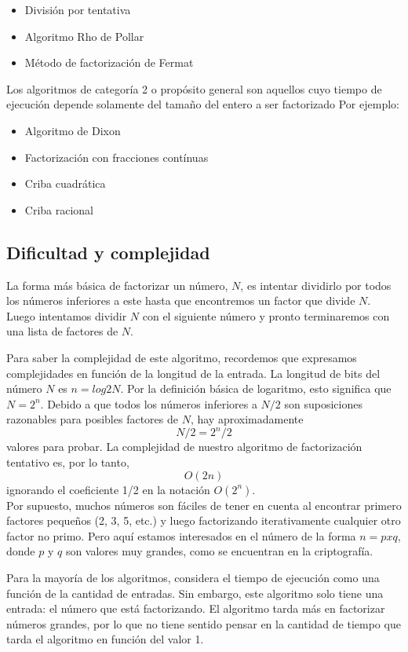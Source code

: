 \documentclass{article}
\begin{document}
\begin{itemize}
    \item División por tentativa
    \item Algoritmo Rho de Pollar
    \item Método de factorización de Fermat
\end{itemize}

Los algoritmos de categoría 2 o propósito general son aquellos cuyo tiempo de
ejecución depende solamente del tamaño del entero a ser factorizado Por ejemplo:

\begin{itemize}
    \item Algoritmo de Dixon
    \item Factorización con fracciones contínuas
    \item Criba cuadrática
    \item Criba racional
\end{itemize}

\subsection{Dificultad y complejidad}


La forma más básica de factorizar un número, $N$, es intentar dividirlo por
todos los números inferiores a este hasta que encontremos un factor que divide
$N$. Luego intentamos dividir $N$ con el siguiente número y pronto terminaremos
con una lista de factores de $N$.

Para saber la complejidad de este algoritmo, recordemos que expresamos
complejidades en función de la longitud de la entrada. La longitud de bits del
número $N$ es $n= log2 N$. Por la definición básica de logaritmo, esto
significa que $N = 2^n$. Debido a que todos los números inferiores a $N/2$ son
suposiciones razonables para posibles factores de $N$, hay aproximadamente $$N/2
= 2^n/2$$ valores para probar. La complejidad de nuestro algoritmo de
factorización tentativo es, por lo tanto, $$ O(2n) $$ ignorando el coeficiente
1/2 en la notación $ O(2^n)$. \\

Por supuesto, muchos números son fáciles de tener en cuenta al encontrar primero
factores pequeños (2, 3, 5, etc.) y luego factorizando iterativamente cualquier
otro factor no primo. Pero aquí estamos interesados en el número de la forma $n
= p x q$, donde $p$ y $q$ son valores muy grandes, como se encuentran en la
criptografía.

Para la mayoría de los algoritmos, considera el tiempo de ejecución como una
función de la cantidad de entradas. Sin embargo, este algoritmo solo tiene una
entrada: el número que está factorizando. El algoritmo tarda más en factorizar
números grandes, por lo que no tiene sentido pensar en la cantidad de tiempo que
tarda el algoritmo en función del valor 1. 
\end{document}
